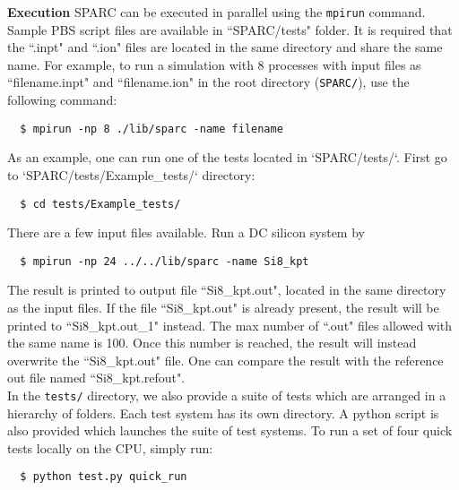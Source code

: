   \begin{frame}{\textbf{Execution}} \label{Execution}
  SPARC can be executed in parallel using the \texttt{mpirun} command. Sample PBS script files are available in ``SPARC/tests" folder. It is required that the ``.inpt" and ``.ion" files are located in the same directory and share the same name. For example, to run a simulation with 8 processes with input files as ``filename.inpt" and ``filename.ion" in the root directory (\texttt{SPARC/}), use the following command:
  \begin{verbatim}
  $ mpirun -np 8 ./lib/sparc -name filename
  \end{verbatim} 
  As an example, one can run one of the tests located in `SPARC/tests/`. First go to `SPARC/tests/Example\_tests/` directory:
  \begin{verbatim}
  $ cd tests/Example_tests/
  \end{verbatim} 
  There are a few input files available. Run a DC silicon system by
  \begin{verbatim}
  $ mpirun -np 24 ../../lib/sparc -name Si8_kpt
  \end{verbatim} 
  
  The result is printed to output file ``Si8\_kpt.out", located in the same directory as the input files. If the file ``Si8\_kpt.out" is already present, the result will be printed to ``Si8\_kpt.out\_1" instead. The max number of ``.out" files allowed with the same name is 100. Once this number is reached, the result will instead overwrite the ``Si8\_kpt.out" file. One can compare the result with the reference out file named ``Si8\_kpt.refout".\\%
  
  
  \hspace{3mm} In the \texttt{tests/} directory, we also provide a suite of tests which are arranged in a hierarchy of folders. Each test system has its own directory. A python script is also provided which launches the suite of test systems. To run a set of four quick tests locally on the CPU, simply run: 
  \begin{verbatim}
  $ python test.py quick_run
  \end{verbatim} 
  

\end{frame}
